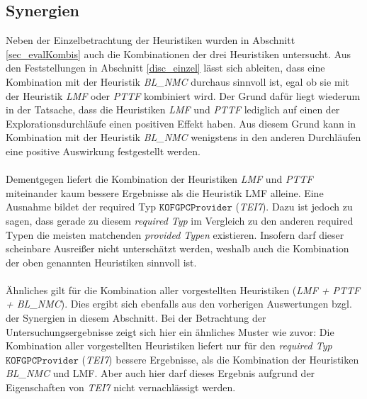\subsection{Synergien}\label{disc_synergien}
Neben der Einzelbetrachtung der Heuristiken wurden in Abschnitt \ref{sec_evalKombis} auch die Kombinationen der drei Heuristiken untersucht. Aus den Feststellungen in Abschnitt \ref{disc_einzel} lässt sich ableiten, dass eine Kombination mit der Heuristik \emph{BL\_NMC} durchaus sinnvoll ist, egal ob sie mit der Heuristik \emph{LMF} oder \emph{PTTF} kombiniert wird. Der Grund dafür liegt wiederum in der Tatsache, dass die Heuristiken \emph{LMF} und \emph{PTTF} lediglich auf einen der Explorationsdurchläufe einen positiven Effekt haben. Aus diesem Grund kann in Kombination mit der Heuristik \emph{BL\_NMC} wenigstens in den anderen Durchläufen eine positive Auswirkung festgestellt werden.
\\\\
Dementgegen liefert die Kombination der Heuristiken \emph{LMF} und \emph{PTTF} miteinander kaum bessere Ergebnisse als die Heuristik LMF alleine. Eine Ausnahme bildet der required Typ $\texttt{KOFGPCProvider}$ (\emph{TEI7}). Dazu ist jedoch zu sagen, dass gerade zu diesem \emph{required Typ} im Vergleich zu den anderen required Typen die meisten matchenden \emph{provided Typen} existieren. Insofern darf dieser scheinbare Ausreißer nicht unterschätzt werden, weshalb auch die Kombination der oben genannten Heuristiken sinnvoll ist.
\\\\
Ähnliches gilt für die Kombination aller vorgestellten Heuristiken (\emph{LMF + PTTF + BL\_NMC}). Dies ergibt sich ebenfalls aus den vorherigen Auswertungen bzgl. der Synergien in diesem Abschnitt. Bei der Betrachtung der Untersuchungsergebnisse zeigt sich hier ein ähnliches Muster wie zuvor: Die Kombination aller vorgestellten Heuristiken liefert nur für den \emph{required Typ} $\texttt{KOFGPCProvider}$ (\emph{TEI7}) bessere Ergebnisse, als die Kombination der Heuristiken \emph{BL\_NMC} und LMF. Aber auch hier darf dieses Ergebnis aufgrund der Eigenschaften von \emph{TEI7} nicht vernachlässigt werden.

